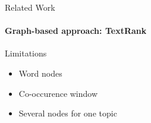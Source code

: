   \begin{frame}[t]{Related Work}
    \framesubtitle{Graph-based approach: TextRank}

    \begin{block}{Limitations}
      \begin{itemize}
        \item{Word nodes}
        \item{Co-occurence window}
        \item{Several nodes for one topic}
      \end{itemize}
    \end{block}
  \end{frame}

